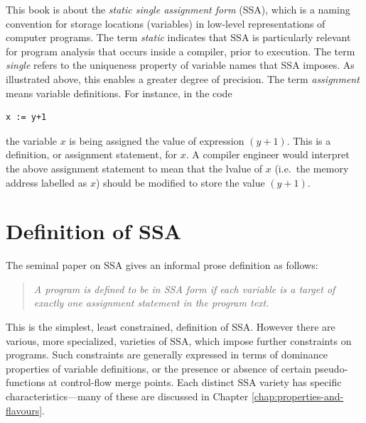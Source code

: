 This book is about the \textit{static single assignment form} (SSA),
which is a naming convention for storage locations (variables)
in low-level representations
of computer programs.
The term \textit{static} indicates that SSA is particularly
relevant for program analysis that occurs inside a 
compiler, prior to execution.
The term \textit{single} refers to the uniqueness property of
variable names that SSA imposes. As illustrated above, this enables
a greater degree of precision.
The term \textit{assignment} means variable definitions. For
instance, in the code 
\begin{verbatim}
x := y+1
\end{verbatim}
the variable $x$ is being assigned the value of expression $(y+1)$.
This is a definition, or assignment statement, for $x$.
A compiler engineer would interpret the above assignment statement
to mean that the lvalue of
$x$ (i.e.\ the memory address labelled as $x$) should be modified to store
the value $(y+1)$.


\section{Definition of SSA}


The seminal paper on SSA 
\cite{cytron91efficiently}
gives an informal prose
definition as follows:

\begin{quotation}
\textit{
A program is defined to be in SSA
form if each variable is a target of
exactly one assignment statement in the
program text.
}
\end{quotation}



This is the simplest,
least constrained, definition of SSA. However
there are various, more specialized, varieties of SSA,
which impose further constraints on programs.
Such constraints are generally expressed in terms
of dominance properties of variable definitions, or
the presence or absence of certain 
pseudo-functions at control-flow merge points.
Each distinct SSA variety has specific characteristics---many of
these are discussed in
Chapter \ref{chap:properties-and-flavours}.

